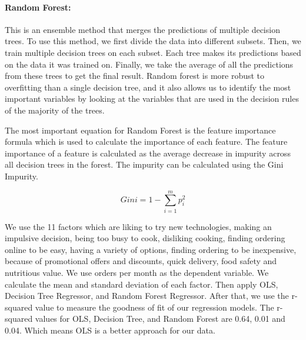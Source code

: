 \documentclass[a4paper,fleqn]{cas-sc}
\begin{document}
\paragraph{Random Forest:}
This is an ensemble method that merges the predictions of multiple decision trees. To use this method, we first divide the data into different subsets. Then, we train multiple decision trees on each subset. Each tree makes its predictions based on the data it was trained on. Finally, we take the average of all the predictions from these trees to get the final result. Random forest is more robust to overfitting than a single decision tree, and it also allows us to identify the most important variables by looking at the variables that are used in the decision rules of the majority of the trees. 

The most important equation for Random Forest is the feature importance formula which is used to calculate the importance of each feature. The feature importance of a feature is calculated as the average decrease in impurity across all decision trees in the forest. The impurity can be calculated using the Gini Impurity.

\begin{equation}
    Gini = 1 - \sum_{i=1}^{m} p_i^2
\end{equation}

We use the 11 factors which are liking to try new technologies, making an impulsive decision, being too busy to cook, disliking cooking, finding ordering online to be easy, having a variety of options, finding ordering to be inexpensive, because of promotional offers and discounts, quick delivery, food safety and nutritious value. We use orders per month as the dependent variable. We calculate the mean and standard deviation of each factor. Then apply OLS, Decision Tree Regressor, and Random Forest Regressor. After that, we use the r-squared value to measure the goodness of fit of our regression models. The r-squared values for OLS, Decision Tree, and Random Forest are 0.64, 0.01 and 0.04. Which means OLS is a better approach for our data.


\end{document}
